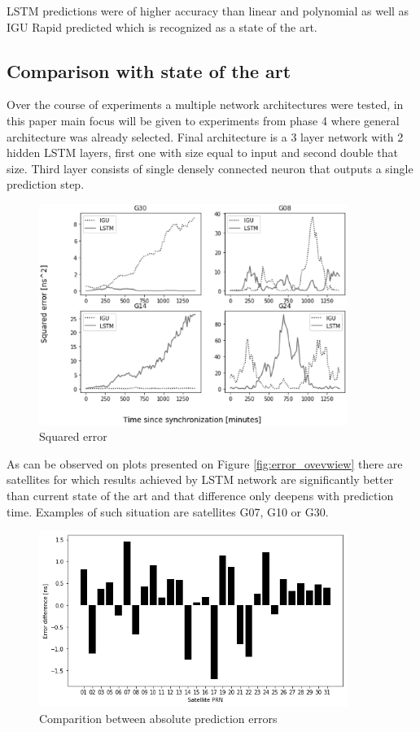 \documentclass{kybernetika}
\begin{document}
LSTM predictions were of higher accuracy than linear and polynomial as well as IGU Rapid
predicted which is recognized as a state of the art.

\subsection{Comparison with state of the art}
Over the course of experiments a multiple network architectures were tested, in this paper
main focus will be given to experiments from phase 4 where general architecture was already
selected.
Final architecture is a 3 layer network with 2 hidden LSTM layers, first one with size equal
to input and second double that size. Third layer consists of single densely connected neuron
that outputs a single prediction step.

\begin{figure}[ht] 
\centering
	\includegraphics[width=10cm]{figures/error_overwiev}
\caption{Squared error}
\label{fig:error_overview}
\end{figure}
As can be observed on plots presented on Figure \ref{fig:error_ovevwiew} there are satellites
for which results achieved by LSTM network are significantly better than current state of the
art and that difference only deepens with prediction time. Examples of such situation are
satellites G07, G10 or G30.
\begin{figure}[ht] 
\centering
	\includegraphics[width=10cm]{figures/error_diff}
\caption{Comparition between absolute prediction errors}
\label{fig:error_comparition}
\end{figure}
\end{document}
